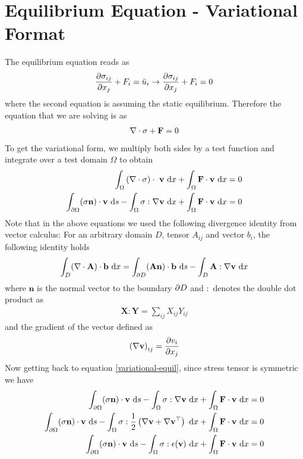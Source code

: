 \section{Equilibrium Equation - Variational Format}
%
The equilibrium equation reads as
%
\begin{align}
  \frac{\partial \sigma_{ij}}{\partial x_{j}}  + F_i = \ddot u_i \to \frac{\partial \sigma_{ij}}{\partial x_{j}}  + F_i  = 0
\end{align}
%
where the second equation is assuming the static
equilibrium. Therefore the equation that we are solving is as
%
\begin{align}
   \nabla \cdot \sigma + \mathbf{F} =0
\end{align}
%
To get the variational form, we multiply both sides by a test function
and integrate over a test domain $\Omega$ to obtain
%
\begin{align}
  \int_{\Omega} \left( \nabla \cdot\sigma\right) \cdot ~\mathbf{v} ~\text{d} x + \int_{\Omega} \mathbf{F} \cdot \mathbf{v} ~\text{d} x = 0\\
  \int_{\partial \Omega} (\sigma \mathbf{n})\cdot \mathbf{v} ~\text{d} s - \int_{\Omega} \sigma : \nabla \mathbf{v}~ \text{d} x + \int_{\Omega} \mathbf{F} \cdot \mathbf{v} ~\text{d} x = 0 \label{variational-equil}
\end{align}
%
Note that in the above equations we used the following divergence
identity from vector calculus: For an arbitrary domain $D$, tensor
$A_{ij}$ and vector $b_i$, the following identity holds
%
\begin{align}
  \int_D (\nabla \cdot \mathbf{A}) \cdot \mathbf{b} ~ \text{d} x  = \int_{\partial D} (\mathbf{An})\cdot \mathbf{b} ~\text{d} s  - \int_D \mathbf{A}:\nabla \mathbf{v} ~\text{d} x
\end{align}
%
where $\mathbf{n}$ is the normal vector to the boundary $\partial D$ and $:$
denotes the double dot product as
%
\begin{align}
  \mathbf{X}: \mathbf{Y} = \sum_{ij} X_{ij}Y_{ij}
\end{align}
%
and the gradient of the vector defined as
%
\begin{align}
  \left( \nabla \mathbf{v} \right)_{ij} = \frac{\partial v_{i}}{\partial x_{j}} 
\end{align}
%
Now getting back to equation \eqref{variational-equil}, since stress
tensor is symmetric we have
%
\begin{align}
  \int_{\partial \Omega} (\sigma \mathbf{n})\cdot \mathbf{v} ~\text{d} s - \int_{\Omega} \sigma : \nabla \mathbf{v}~ \text{d} x + \int_{\Omega} \mathbf{F} \cdot \mathbf{v} ~\text{d} x = 0 \\
  \int_{\partial \Omega} (\sigma \mathbf{n})\cdot \mathbf{v} ~\text{d} s - \int_{\Omega} \sigma : \frac{1}{2} \left( \nabla \mathbf{v} + \nabla \mathbf{v}^{\top} \right) ~ \text{d} x + \int_{\Omega} \mathbf{F} \cdot \mathbf{v} ~\text{d} x = 0 \\
    \int_{\partial \Omega} (\sigma \mathbf{n})\cdot \mathbf{v} ~\text{d} s - \int_{\Omega} \sigma : \epsilon(\mathbf{v}) ~ \text{d} x + \int_{\Omega} \mathbf{F} \cdot \mathbf{v} ~\text{d} x = 0
\end{align}
